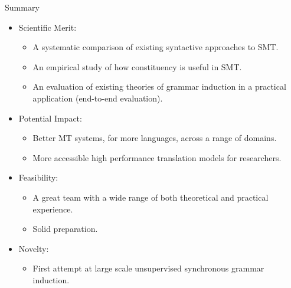 \documentclass{beamer}
\begin{document}
\begin{frame}[t]{Summary}
\begin{itemize}
\item Scientific Merit:
  \begin{itemize}
  \item A systematic comparison of existing syntactive approaches to SMT.
  \item An empirical study of how constituency is useful in SMT.
  \item An evaluation of existing theories of grammar induction in a practical application (end-to-end evaluation).
  \end{itemize}
\item Potential Impact:
  \begin{itemize}
  \item Better MT systems, for more languages, across a range of domains.
  \item More accessible high performance translation models for researchers. %
  \end{itemize}
\item Feasibility:
  \begin{itemize}
  \item A great team with a wide range of both theoretical and practical experience.
  \item Solid preparation.
  \end{itemize}
\item Novelty:
  \begin{itemize}
  \item First attempt at large scale unsupervised synchronous grammar induction.
  \end{itemize}
\end{itemize}
\end{frame}
\end{document}
